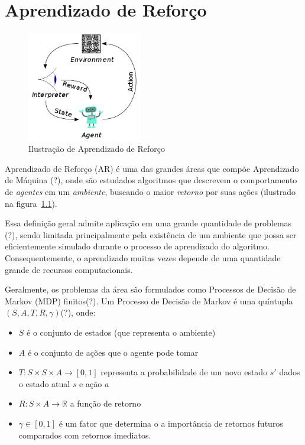 \chapter{Aprendizado de Reforço}
\label{cap:reforco}

\begin{figure}
    \centering
        \includegraphics[width=5cm]{figuras/rl}
    \caption{Ilustração de Aprendizado de Reforço}
    \label{fig:rl}
\end{figure}

Aprendizado de Reforço (AR) é uma das grandes áreas que compõe Aprendizado de Máquina (?),
onde são estudados algoritmos que descrevem o comportamento de \textit{agentes} em um \textit{ambiente},
buscando o maior \textit{retorno} por suas ações (ilustrado na figura~\ref{fig:rl}).

Essa definição geral admite aplicação em uma grande quantidade de problemas (?),
sendo limitada principalmente pela existência de um ambiente que possa ser eficientemente simulado durante o processo de aprendizado do algoritmo.
Consequentemente, o aprendizado muitas vezes depende de uma quantidade grande de recursos computacionais.

Geralmente, os problemas da área são formulados como Processos de Decisão de Markov (MDP) finitos(?).
Um Processo de Decisão de Markov é uma quíntupla $(S,A,T,R,\gamma)$(?), onde:
\begin{itemize}
    \item $S$ é o conjunto de estados (que representa o ambiente)
    \item $A$ é o conjunto de ações que o agente pode tomar
    \item $T: S \times S \times A \to [0, 1]$ representa a probabilidade de um novo estado $s'$ dados o estado atual $s$ e ação $a$
    \item $R: S \times A \to \mathbb{R}$ a função de retorno
    \item $\gamma \in [0, 1]$ é um fator que determina o a importância de retornos futuros comparados com retornos imediatos.   
\end{itemize}

